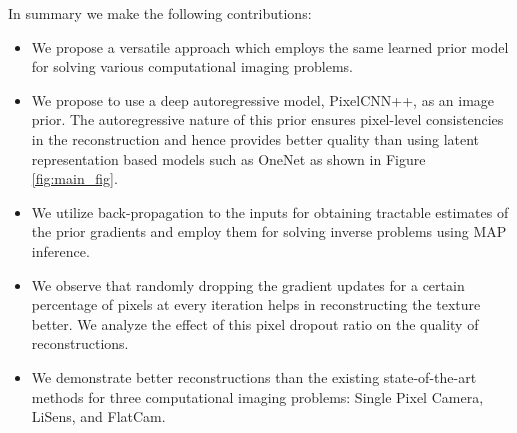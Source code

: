 \documentclass[journal,twoside]{IEEEtran}
\begin{document}
In summary we make the following contributions: 
\begin{itemize}
    \item We propose a versatile approach which employs the same learned prior model for solving various computational imaging problems. 
    
    \item We propose to use a deep autoregressive model, PixelCNN++, as an image prior. The autoregressive nature of this prior ensures pixel-level consistencies in the reconstruction and hence provides better quality than using latent representation based models such as OneNet \cite{chang2017one} as shown in Figure \ref{fig:main_fig}.
    
    \item We utilize back-propagation to the inputs for obtaining tractable estimates of the prior gradients and employ them for solving inverse problems using MAP inference.
    
    \item We observe that randomly dropping the gradient updates for a certain percentage of pixels at every iteration helps in reconstructing the texture better. We analyze the effect of this pixel dropout ratio on the quality of reconstructions.
    
    \item We demonstrate better reconstructions than the existing state-of-the-art methods for three computational imaging problems: Single Pixel Camera, LiSens, and FlatCam. 
\end{itemize}



\end{document}
